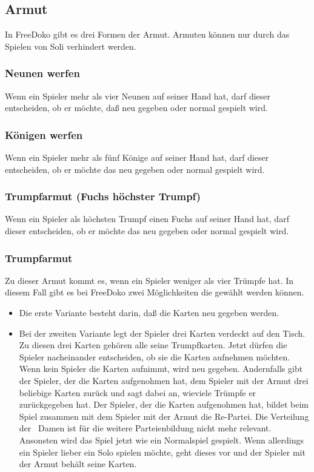 \documentclass{scrartcl}
\begin{document}
\subsection{Armut}
In FreeDoko gibt es \optional drei Formen der Armut.  Armuten können nur durch das Spielen von Soli verhindert werden.

\subsubsection{Neunen werfen}
Wenn ein Spieler mehr als vier Neunen auf seiner Hand hat, darf dieser entscheiden, ob er möchte, daß neu gegeben oder normal gespielt wird.

\subsubsection{Königen werfen}
Wenn ein Spieler mehr als fünf Könige auf seiner Hand hat, darf dieser entscheiden, ob er möchte das neu gegeben oder normal gespielt wird.

\subsubsection{Trumpfarmut (Fuchs höchster Trumpf)}
Wenn ein Spieler als höchsten Trumpf einen Fuchs auf seiner Hand hat, darf dieser entscheiden, ob er möchte das neu gegeben oder normal gespielt wird.

\subsubsection{Trumpfarmut}
Zu dieser Armut kommt es, wenn ein Spieler weniger als vier Trümpfe hat. In diesem Fall gibt es bei FreeDoko zwei Möglichkeiten die \optional gewählt werden können.
\begin{itemize}
  \item
    Die erste Variante besteht darin, daß die Karten neu gegeben werden.
  \item
    Bei der zweiten Variante legt der Spieler drei Karten verdeckt
    auf den Tisch. Zu diesen drei Karten gehören alle seine
    Trumpfkarten. Jetzt dürfen die Spieler nacheinander entscheiden,
    ob sie die Karten aufnehmen möchten. Wenn kein Spieler die
    Karten aufnimmt, wird neu gegeben. Andernfalls gibt der Spieler,
    der die Karten aufgenohmen hat, dem Spieler mit der Armut drei
    beliebige Karten zurück und sagt dabei an, wieviele Trümpfe er
    zurückgegeben hat. Der Spieler, der die Karten aufgenohmen hat,
    bildet beim Spiel zusammen mit dem Spieler mit der Armut die
    Re-Partei. Die Verteilung der \Kreuz\ Damen ist für die weitere
    Parteienbildung nicht mehr relevant. Ansonsten wird das Spiel
    jetzt wie ein Normalspiel gespielt. Wenn allerdings ein Spieler
    lieber ein Solo spielen möchte, geht dieses vor und der Spieler
    mit der Armut behält seine Karten.
\end{itemize}
\end{document}

